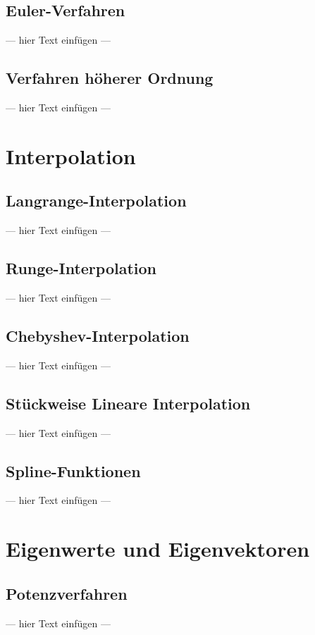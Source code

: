 \documentclass[a4paper, 12pt]{article}
\begin{document}
\subsection{Euler-Verfahren}
--- hier Text einfügen ---


\subsection{Verfahren höherer Ordnung}
--- hier Text einfügen ---



\section{Interpolation}


\subsection{Langrange-Interpolation}
--- hier Text einfügen ---


\subsection{Runge-Interpolation}
--- hier Text einfügen ---


\subsection{Chebyshev-Interpolation}
--- hier Text einfügen ---


\subsection{Stückweise Lineare Interpolation}
--- hier Text einfügen ---


\subsection{Spline-Funktionen}
--- hier Text einfügen ---



\section{Eigenwerte und Eigenvektoren}


\subsection{Potenzverfahren}
--- hier Text einfügen ---
\end{document}
